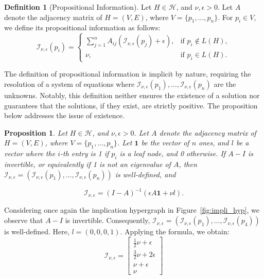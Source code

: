 \documentclass[11pt]{article}
\theoremstyle{definition}
\newtheorem{definition}{Definition}[section]
\theoremstyle{plain}
\newtheorem{proposition}{Proposition}[section]
\theoremstyle{remark}
\begin{document}
\begin{definition}[Propositional Information]\label{def:prop_info}
Let $H\in \mathcal{H}$, and $\nu, \epsilon>0$. Let $A$ denote the adjacency matrix of $H=(V,E)$, where $V=\{p_1,\ldots,p_n\}$. For $p_i\in V$, we define its propositional information as follows:
\[
\mathcal{I}_{\nu, \epsilon}(p_i) =
\begin{cases}
\displaystyle \sum_{j=1}^{n} A_{ij} (\mathcal{I}_{\nu, \epsilon}(p_j) + \epsilon), & \text{if } p_i \notin L(H), \\
\nu, & \text{if } p_i \in L(H).
\end{cases}
\]



\end{definition}

The definition of propositional information is implicit by nature, requiring the resolution of a system of equations where \( \mathcal{I}_{\nu, \epsilon}(p_1), \ldots, \mathcal{I}_{\nu, \epsilon}(p_n) \) are the unknowns. Notably, this definition neither ensures the existence of a solution nor guarantees that the solutions, if they exist, are strictly positive. The proposition below addresses the issue of existence.

\begin{proposition}\label{prop:well-defined}
\normalfont
Let $H\in \mathcal{H}$, and $\nu, \epsilon>0$. Let $A$ denote the adjacency matrix of $H=(V,E)$, where $V=\{p_1,\ldots,p_n\}$. Let \( \mathbf{1} \) be the vector of $n$ ones, and \( l \) be a vector where the \( i \)-th entry is 1 if \( p_i \) is a leaf node, and 0 otherwise. If \( A - I \) is invertible, or equivalently if 1 is not an eigenvalue of \( A \), then \( \mathcal{I}_{\nu, \epsilon} = (\mathcal{I}_{\nu, \epsilon}(p_1), \ldots, \mathcal{I}_{\nu, \epsilon}(p_n)) \) is well-defined, and

\[
\mathcal{I}_{\nu, \epsilon} = (I - A)^{-1} \left( \epsilon A \mathbf{1} + \nu l \right).
\]
\end{proposition}

Considering once again the implication hypergraph in Figure~\ref{fig:impli_hyp}, we observe that \( A - I \) is invertible. Consequently, \( \mathcal{I}_{\nu, \epsilon} = (\mathcal{I}_{\nu, \epsilon}(p_1), \ldots, \mathcal{I}_{\nu, \epsilon}(p_4)) \) is well-defined. Here, \( l = (0, 0, 0, 1) \). Applying the formula, we obtain:
\[
\renewcommand{\arraystretch}{1.2}
\mathcal{I}_{\nu, \epsilon} = \begin{bmatrix}
\tfrac{1}{2}\nu + \epsilon\\
\tfrac{3}{2}\nu + 2\epsilon \\
\nu + \epsilon\\
\nu
\end{bmatrix}
\]
\end{document}
